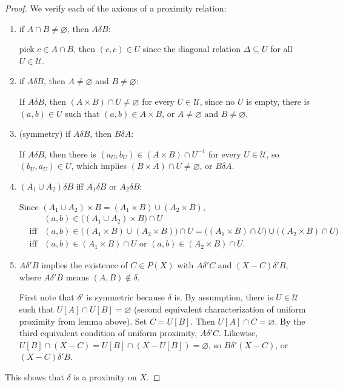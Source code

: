 \documentclass[12pt]{article}
\begin{document}
\begin{proof}
We verify each of the axioms of a proximity relation:
\begin{enumerate}
\item if $A\cap B\ne \varnothing$, then $A\delta B$:

pick $c\in A\cap B$, then $(c,c)\in U$ since the diagonal relation $\Delta\subseteq U$ for all $U\in \mathcal{U}$.

\item if $A\delta B$, then $A\ne \varnothing$ and $B\ne \varnothing$:

If $A\delta B$, then $(A\times B)\cap U\ne \varnothing$ for every $U\in\mathcal{U}$, since no $U$ is empty, there is $(a,b)\in U$ such that $(a,b)\in A\times B$, or $A\ne \varnothing$ and $B\ne \varnothing$.

\item (symmetry) if $A\delta B$, then $B\delta A$:

If $A\delta B$, then there is $(a_U,b_U)\in (A\times B)\cap U^{-1}$ for every $U\in \mathcal{U}$, so $(b_U,a_U)\in U$, which implies $(B\times A)\cap U\ne \varnothing$, or $B\delta A$.

\item $(A_1\cup A_2)\delta B$ iff $A_1\delta B$ or $A_2\delta B$:

Since $(A_1\cup A_2)\times B=(A_1\times B)\cup (A_2\times B)$, 
\begin{eqnarray*}
&& (a,b)\in \big((A_1\cup A_2)\times B\big)\cap U \\ & \mbox{iff} & (a,b)\in \big((A_1\times B)\cup (A_2\times B)\big)\cap U  = \big((A_1\times B)\cap U\big)\cup \big((A_2\times B)\cap U\big) \\ & \mbox{iff} & (a,b)\in (A_1\times B)\cap U \mbox{ or } (a,b)\in (A_2\times B)\cap U.
\end{eqnarray*}

\item $A\delta'B$ implies the existence of $C\in P(X)$ with $A\delta'C$ and $(X-C)\delta'B$, where $A\delta'B$ means $(A,B)\notin \delta$.

First note that $\delta'$ is symmetric because $\delta$ is.  By assumption, there is $U\in \mathcal{U}$ such that $U[A]\cap U[B]=\varnothing$ (second equivalent characterization of uniform proximity from lemma above).  Set $C=U[B]$.  Then $U[A]\cap C=\varnothing$.  By the third equivalent condition of uniform proximity, $A\delta'C$.  Likewise, $U[B]\cap (X-C) = U[B]\cap (X-U[B]) = \varnothing$, so $B\delta' (X-C)$, or $(X-C)\delta' B$.
\end{enumerate}

This shows that $\delta$ is a proximity on $X$.
\end{proof}
\end{document}
